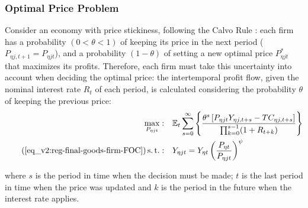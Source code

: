 \documentclass[../thesis.tex]{subfiles}
\begin{document}
\begin{comment}
	
As salaries and technology are the same for all firms in region $\eta$, the $j$ index can be dropped from the marginal cost $\Lambda$:
\begin{alignat}{2}
	\Lambda_{\eta t} = \frac{W_{\eta t}}{Z_{A\eta t}} \label{eq_v2:reg-int-good-firm-prod-function}
\end{alignat}

Notice that:
\begin{align}
	TC_{\eta jt} &= W_{\eta t} L_{\eta jt} = \Lambda_{\eta t} Y_{\eta jt} 
	MC_{\eta jt} &= \frac{\partial TC_{\eta jt}}{\partial Y_{\eta jt}} = \Lambda_{\eta t} \nonumber
\end{align}

\end{comment}


\subsubsection*{Optimal Price Problem}

Consider an economy with price stickiness, following the Calvo Rule \cite{calvo_staggered_1983}: each firm has a probability $(0 < \theta < 1)$ of keeping its price in the next period ($P_{\eta j,t+1} = P_{\eta jt}$), and a probability $(1 - \theta)$ of setting a new optimal price $P_{\eta jt}^{\ast}$ that maximizes its profits. Therefore, each firm must take this uncertainty into account when deciding the optimal price: the intertemporal profit flow, given the nominal interest rate $R_{t}$ of each period, is calculated considering the probability $\theta$ of keeping the previous price:
\begin{align}
	\label{eq_v2:reg-int-good-firm-optimal-price-problem}
	\max_{P_{\eta jt}}: & \quad \E \sum_{s=0}^{\infty} \left\{ \frac{ \theta^s \left[ P_{\eta jt} Y_{\eta j,t+s} - TC_{\eta j,t+s} \right]}{\prod_{k=0}^{s-1}(1+R_{t+k})} \right\} \\
	\tag{\ref{eq_v2:reg-final-goods-firm-FOC}}
	\st: & \quad Y_{\eta jt} = Y_{\eta t} \left( \frac{P_{\eta t}}{P_{\eta jt}} \right)^{\psi}
\end{align}

where $s$ is the period in time when the decision must be made; $t$ is the last period in time when the price was updated and $k$ is the period in the future when the interest rate applies.
\end{document}
